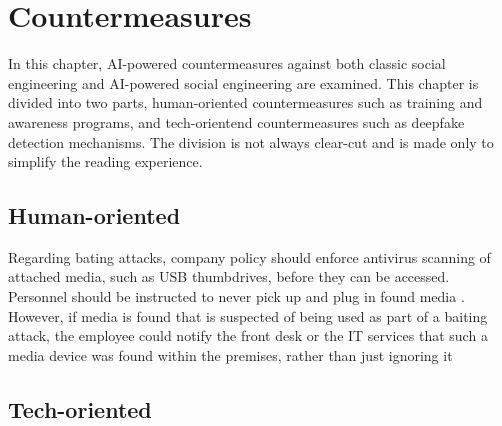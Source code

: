 



\chapter{Countermeasures\label{countermeasures}}
\begin{comment}


\end{comment}


In this chapter, AI-powered countermeasures against both classic social engineering and AI-powered social engineering are examined. This chapter is divided into two parts, human-oriented countermeasures such as training and awareness programs, and tech-orientend countermeasures such as deepfake detection mechanisms. The division is not always clear-cut and is made only to simplify the reading experience.


\section{Human-oriented}
\begin{comment}
    
    - 

\end{comment}


Regarding bating attacks, company policy should enforce antivirus scanning of attached media, such as USB thumbdrives, before they can be accessed. Personnel should be instructed to never pick up and plug in found media \citep{salahdine_social_2019}. However, if media is found that is suspected of being used as part of a baiting attack, the employee could notify the front desk or the IT services that such a media device was found within the premises, rather than just ignoring it 

\section{Tech-oriented}
\begin{comment}
    
    - 

\end{comment}
